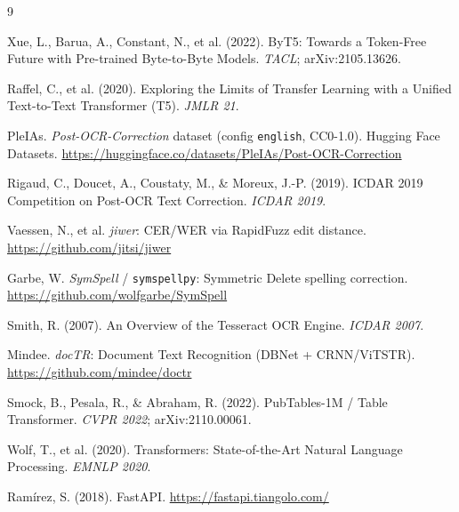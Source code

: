 \documentclass[12pt,a4paper]{article}
\begin{document}
\newpage
\begin{thebibliography}{9}

 Xue, L., Barua, A., Constant, N., et al. (2022). ByT5: Towards a Token-Free Future with Pre-trained Byte-to-Byte Models. \textit{TACL}; arXiv:2105.13626.

 Raffel, C., et al. (2020). Exploring the Limits of Transfer Learning with a Unified Text-to-Text Transformer (T5). \textit{JMLR 21}.

 PleIAs. \textit{Post-OCR-Correction} dataset (config \texttt{english}, CC0-1.0). Hugging Face Datasets. \url{https://huggingface.co/datasets/PleIAs/Post-OCR-Correction}

 Rigaud, C., Doucet, A., Coustaty, M., \& Moreux, J.-P. (2019). ICDAR 2019 Competition on Post-OCR Text Correction. \textit{ICDAR 2019}.

 Vaessen, N., et al. \textit{jiwer}: CER/WER via RapidFuzz edit distance. \url{https://github.com/jitsi/jiwer}

 Garbe, W. \textit{SymSpell} / \texttt{symspellpy}: Symmetric Delete spelling correction. \url{https://github.com/wolfgarbe/SymSpell}

 Smith, R. (2007). An Overview of the Tesseract OCR Engine. \textit{ICDAR 2007}.

 Mindee. \textit{docTR}: Document Text Recognition (DBNet + CRNN/ViTSTR). \url{https://github.com/mindee/doctr}

 Smock, B., Pesala, R., \& Abraham, R. (2022). PubTables-1M / Table Transformer. \textit{CVPR 2022}; arXiv:2110.00061.

 Wolf, T., et al. (2020). Transformers: State-of-the-Art Natural Language Processing. \textit{EMNLP 2020}.

 Ram\'irez, S. (2018). FastAPI. \url{https://fastapi.tiangolo.com/}

\end{thebibliography}
\end{document}
